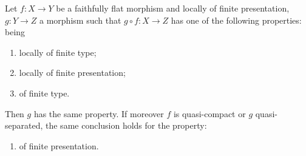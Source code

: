 \begin{lemma}[17.7.5]
\label{IV.17.7.5}
Let $f:X\to Y$ be a faithfully flat morphism and locally of finite presentation, $g:Y\to Z$ a morphism such that $g\circ f:X\to Z$ has one of the following properties: being
\begin{enumerate}[label=(\roman*)]
  \item locally of finite type;
  \item locally of finite presentation;
  \item of finite type.
\end{enumerate}
Then $g$ has the same property.
If moreover $f$ is quasi-compact or $g$ quasi-separated, the same conclusion holds for the property:
\begin{enumerate}
  \item[(iv)] of finite presentation.
\end{enumerate}
\end{lemma}

